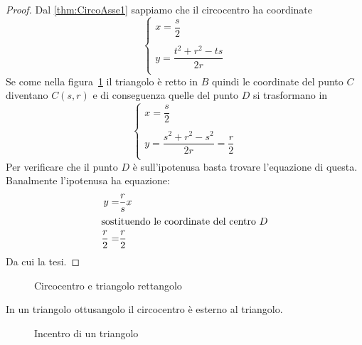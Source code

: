 \begin{proof}
	Dal \cref{thm:CircoAsse1} sappiamo che il circocentro ha coordinate
	\[	\begin{cases}
	x=\dfrac{s}{2}\\ \\
	y=\dfrac{t^2+r^2-ts}{2r}\\
	\end{cases}\]
	Se come nella figura~\cref{fig:circumcerchio3} il triangolo è retto in $B$ quindi le coordinate del punto $C$ diventano $C(s,r)$ e di conseguenza quelle del punto $D$ si trasformano in 	\[\begin{cases}
	x=\dfrac{s}{2}\\ \\
	y=\dfrac{s^2+r^2-s^2}{2r}=\dfrac{r}{2}\\
	\end{cases}\]Per verificare che il punto $D$ è sull'ipotenusa basta trovare l'equazione di questa. Banalmente l'ipotenusa ha equazione:
	\begin{align*}
	y=&\dfrac{r}{s}x\\
	\intertext{sostituendo le coordinate del centro $D$}
	\dfrac{r}{2}=&\dfrac{r}{2}
	\end{align*}
	Da cui la tesi.
\end{proof}
\begin{figure}
	\centering
	
	\caption{Circocentro e triangolo rettangolo}
	\label{fig:circumcerchio3}
\end{figure}
\begin{cor}\label{cor:CircoAsse2}
	In un triangolo ottusangolo il circocentro è esterno al triangolo.
\end{cor}
\begin{figure}
	\centering
	
	\caption{Incentro di un triangolo}
	\label{fig:incentro1}
\end{figure}
